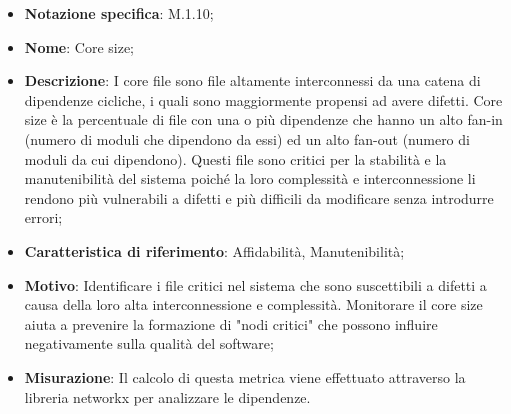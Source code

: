 \begin{itemize}
    \item \textbf{Notazione specifica}: M.1.10;
    \item \textbf{Nome}: Core size;
    \item \textbf{Descrizione}: I core file sono file altamente interconnessi da una catena di dipendenze cicliche, i quali sono maggiormente propensi ad avere difetti. Core size è la percentuale di file con una o più dipendenze che hanno un alto fan-in (numero di moduli che dipendono da essi) ed un alto fan-out (numero di moduli da cui dipendono). Questi file sono critici per la stabilità e la manutenibilità del sistema poiché la loro complessità e interconnessione li rendono più vulnerabili a difetti e più difficili da modificare senza introdurre errori;
    \item \textbf{Caratteristica di riferimento}: Affidabilità, Manutenibilità;
    \item \textbf{Motivo}: Identificare i file critici nel sistema che sono suscettibili a difetti a causa della loro alta interconnessione e complessità. Monitorare il core size aiuta a prevenire la formazione di "nodi critici" che possono influire negativamente sulla qualità del software;
    \item \textbf{Misurazione}: Il calcolo di questa metrica viene effettuato attraverso la libreria networkx per analizzare le dipendenze.
\end{itemize}

